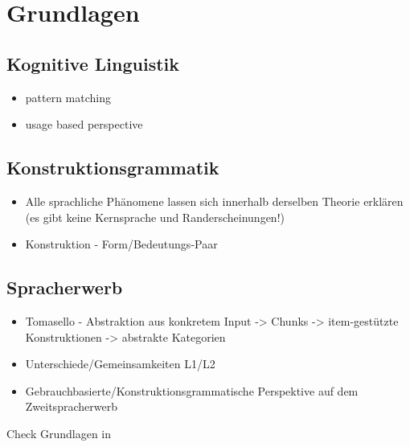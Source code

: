 \section{Grundlagen}

\subsection{Kognitive Linguistik}
\begin{itemize}
    \item pattern matching
    \item usage based perspective
\end{itemize}


\subsection{Konstruktionsgrammatik}
\begin{itemize}
\item Alle sprachliche Phänomene lassen sich innerhalb derselben Theorie erklären (es gibt keine Kernsprache und Randerscheinungen!)
\item Konstruktion - Form/Bedeutungs-Paar
\end{itemize}

\subsection{Spracherwerb}
\begin{itemize}
    \item Tomasello - Abstraktion aus konkretem Input -> Chunks -> item-gestützte Konstruktionen -> abstrakte Kategorien
    \item Unterschiede/Gemeinsamkeiten L1/L2
    \item Gebrauchbasierte/Konstruktionsgrammatische Perspektive auf dem Zweitspracherwerb
\end{itemize}

Check Grundlagen in \cite{Ziem13}
